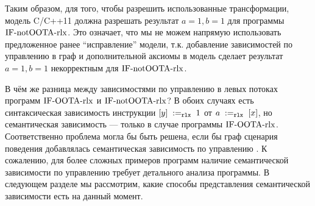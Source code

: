 Таким образом, для того, чтобы разрешить использованные трансформации,
модель C/C++11 должна разрешать результат $a = 1, b = 1$ для программы
${\rm IF\text{-}notOOTA\text{-}rlx}$.
Это означает, что мы не можем напрямую использовать предложенное ранее ``исправление'' модели, т.к.
добавление зависимостей по управлению в граф и дополнительной аксиомы в модель сделает результат
$a = 1, b = 1$ некорректным для ${\rm IF\text{-}notOOTA\text{-}rlx}$.

В чём же разница между зависимостями по управлению в левых потоках программ 
${\rm IF\text{-}OOTA\text{-}rlx}$ и ${\rm IF\text{-}notOOTA\text{-}rlx}$?
В обоих случаях есть синтаксическая зависимость инструкции $[y] \;:=_{\mathtt{rlx}}\;1$ от
$a \;:=_{\mathtt{rlx}}\;[x]$, но семантическая зависимость ---
только в случае программы ${\rm IF\text{-}OOTA\text{-}rlx}$.
Соответственно проблема могла бы быть решена, если бы граф сценария поведения добавлялась
семантическая зависимость по управлению \cite{Batty-Sewell:WNote14}.
К сожалению, для более сложных примеров программ наличие семантической зависимости по управлению
требует детального анализа программы.
В следующем разделе мы рассмотрим, какие способы представления семантической зависимости
есть на данный момент.


